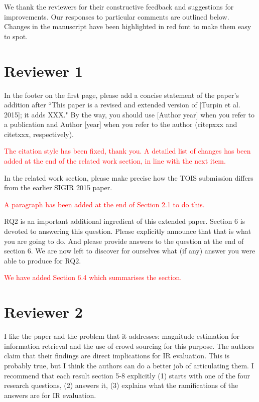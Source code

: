 \documentclass[a4paper]{article}
\newcommand{\comment}[1]{\vspace{1em} \textcolor{red}{{#1}} \vspace{1em}}
\begin{document}
We thank the reviewers for their constructive feedback and suggestions
for improvements.
Our responses to particular comments are outlined below.
Changes in the manuscript have been highlighted in red font to make
them easy to spot.


\section{Reviewer 1}

In the footer on the first page, please add a concise statement of
the paper's addition after ``This paper is a revised and extended
version of [Turpin et al. 2015]; it adds XXX." By the way, you
should use [Author year] when you refer to a publication and Author
[year] when you refer to the author (citep{xxx} and citet{xxx},
respectively).

\comment{The citation style has been fixed, thank you. A detailed list of changes has
been added at the end of the related work section, in line with the next
item.}

In the related work section, please make precise how the TOIS
submission differs from the earlier SIGIR 2015 paper.

\comment{A paragraph has been added at the end of Section 2.1 to do this.}

RQ2 is an important additional ingredient of this extended paper.
Section 6 is devoted to answering this question. Please explicitly
announce that that is what you are going to do. And please provide
answers to the question at the end of section 6. We are now left
to discover for ourselves what (if any) answer you were able to
produce for RQ2.

\comment{We have added Section 6.4 which summarises the section.}



\section{Reviewer 2}

I like the paper and the problem that it addresses: magnitude
estimation for information retrieval and the use of crowd sourcing
for this purpose. The authors claim that their findings are direct
implications for IR evaluation. This is probably true, but I think
the authors can do a better job of articulating them. I recommend
that each result section 5-8 explicitly (1) starts with one of the
four research questions, (2) answers it, (3) explains what the
ramifications of the answers are for IR evaluation.
\end{document}
